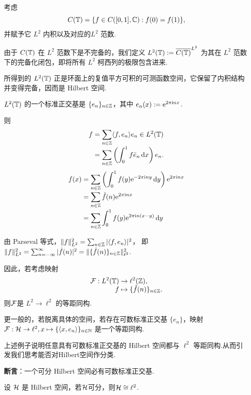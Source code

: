 \begin{instance}
    考虑 
    \begin{equation*}
    C(\mathbb{T}) = \{f \in C([0,1], \mathbb{C}) : f(0) = f(1)\},
    \end{equation*}
    并赋予它 $L^2$ 内积以及对应的$L^2$ 范数.\par
    由于 $C(\mathbb{T})$ 在 $L^2$ 范数下是不完备的，我们定义 $L^2(\mathbb{T}) := \overline{C(\mathbb{T})}^{L^2}$ 为其在 $L^2$ 范数下的完备化闭包，即将所有 $L^2$ 柯西列的极限包含进来.\par
    所得到的 $L^2(\mathbb{T})$ 正是环面上的复值平方可积的可测函数空间，它保留了内积结构并变得完备，因而是 Hilbert 空间.\par
    $L^2(\mathbb{T})$ 的一个标准正交基是 $\{e_n\}_{n \in \mathbb{Z}}$，其中 $e_n(x) := \mathrm{e}^{2\pi \mathrm{i} n x}$.\par
    则
    \begin{align*}
        f &= \sum_{n \in \mathbb{Z}} \langle f, e_n \rangle e_n \in L^2(\mathbb{T}) \\[-3pt]
        &= \sum_{n \in \mathbb{Z}} \left( \int_0^1 f \bar{e}_n \mathop{}\!\mathrm{d} x \right) e_n.
    \end{align*}
    \allowdisplaybreaks
    \begin{align*}
        f(x) &= \sum_{n \in \mathbb{Z}} \left( \int_0^1 f(y) \mathrm{e}^{-2\pi\mathrm{i} n y} \mathop{}\!\mathrm{d} y \right) \mathrm{e}^{2\pi\mathrm{i} n x} \\[-2pt]
        &= \sum_{n \in \mathbb{Z}} \hat{f}(n) \mathrm{e}^{2\pi\mathrm{i} n x} \\[-2pt]
        &= \sum_{n \in \mathbb{Z}} \int_0^1 f(y) \mathrm{e}^{2\pi\mathrm{i} n (x-y)} \mathop{}\!\mathrm{d} y
    \end{align*}
    
    由 Parseval 等式，$\|f\|_{L^2}^2 = \sum_{n \in \mathbb{Z}} |\langle f, e_n \rangle|^2$，
    即 $\|f\|_{L^2}^2 = \sum_{n=-\infty}^\infty |\hat{f}(n)|^2 = \|\{\hat{f}(n)\}_{n \in \mathbb{Z}}\|_{\ell^2}^2$.
    
    因此，若考虑映射 \begin{align*}
        \mathcal{F}:L^2(\mathbb{T}) &\to \ell^2(\mathbb{Z}), \\[-5pt]
        f &\mapsto \{\hat{f}(n)\}_{n \in \mathbb{Z}}.
    \end{align*}
    则$\mathcal{F}$是 $L^2 \to \ell^2$ 的等距同构.\par
    更一般的，若脱离具体的空间，若存在可数标准正交基 $\{e_n\}$，映射 $\mathcal{F}: \mathcal{H} \to \ell^2, x \mapsto \{\langle x, e_n \rangle\}_{n \in \mathbb{N}}$ 是一个等距同构.
\end{instance}
上述例子说明任意具有可数标准正交基的 Hilbert 空间都与 $\ell^2$ 等距同构.从而引发我们思考能否对Hilbert空间作分类.\par
\textbf{断言}：一个可分 Hilbert 空间必有可数标准正交基.
\begin{corollary}
    设 $\mathcal{H}$ 是 Hilbert 空间，若$\mathcal{H}$可分，则$\mathcal{H} \cong \ell^2$.
\end{corollary}


